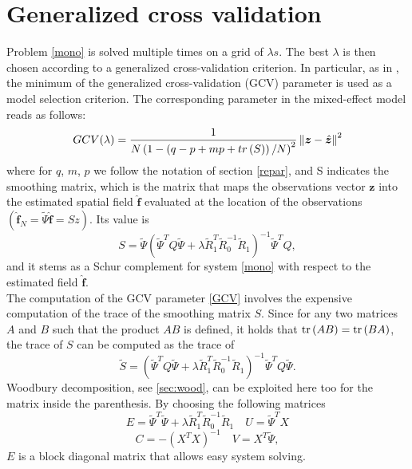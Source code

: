 \section{Generalized cross validation}
Problem \ref{mono} is solved multiple times on a grid of $\lambda s$. The best
$\lambda$ is then chosen according to a generalized cross-validation criterion.
In particular, as in \cite{sangalli1}, the minimum of the generalized
cross-validation (GCV) parameter is used as a model selection criterion. The
corresponding parameter in the mixed-effect model reads as follows:
\begin{equation}
	\label{GCV}
	GCV(\lambda) = \frac{1}{N\left(1-\left(q-p+mp+tr\left(S\right)\right)/N\right)^2}\left\|\bm{z} - \hat{\bm{z}}\right\|^2
\end{equation}
where for $q$, $m$, $p$ we follow the notation of section
\ref{repar}, and S indicates the smoothing matrix, which is the matrix that
maps the observations vector $\bm{z}$ into the estimated spatial field
$\hat{\bm{f}}$ evaluated at the location of the observations $(\hat{\bm{f}}_N =
	\tilde{\Psi}\hat{\bm{f}} = S z)$. Its value is
\begin{equation}
	S = \tilde{\Psi} \left(\tilde{\Psi}^TQ\tilde{\Psi} + \lambda \tilde{R}_1^T
	\tilde{R}_0^{-1} \tilde{R}_1\right)^{-1}\tilde{\Psi}^TQ,
\end{equation}
and it stems as a Schur complement for system \ref{mono} with respect
to the estimated field $\hat{\bm{f}}$.\\ The computation of the GCV parameter
\ref{GCV} involves the expensive computation of the trace of the smoothing
matrix $S$. Since for any two matrices $A$ and $B$ such that the product $AB$
is defined, it holds that $\operatorname*{tr} \left(AB\right) = \operatorname*{tr} \left(BA\right)$,
the trace of $S$ can be computed as the trace of
\begin{equation}
	\label{s_tilda}
	\tilde{S} = \left(\tilde{\Psi}^TQ\tilde{\Psi} + \lambda \tilde{R}_1^T
	\tilde{R}_0^{-1} \tilde{R}_1\right)^{-1}\tilde{\Psi}^TQ \tilde{\Psi}.
\end{equation}
Woodbury decomposition, see \ref{sec:wood}, can be exploited here too
for the matrix inside the parenthesis. By choosing the following matrices
\begin{equation}
	E = \tilde{\Psi}^T\tilde{\Psi} +  \lambda \tilde{R}_1^T
	\tilde{R}_0^{-1} \tilde{R}_1
	\quad U =
	\tilde{\Psi}^TX
\end{equation}
\begin{equation*}
	C = - \left( X^TX \right)^{-1}
	\quad V = X^T \tilde{\Psi},
\end{equation*} $E$ is a block diagonal matrix that allows easy system solving.
